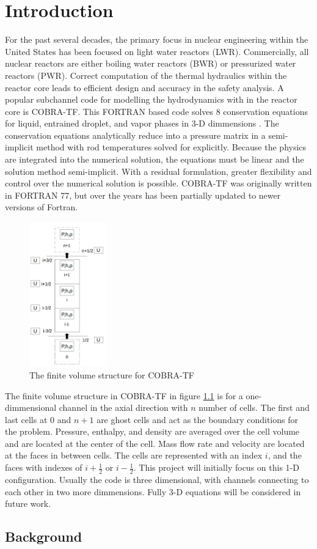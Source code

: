 \vspace*{-80mm}
\chapter{Introduction} \label{chapter1:introduction}

For the past several decades, the primary focus in nuclear engineering
within the United States has been focused on light water reactors (LWR).
Commercially, all nuclear reactors are either boiling water reactors (BWR)
or pressurized water reactors (PWR). Correct computation of the
thermal hydraulics within the reactor core leads to efficient design and
accuracy in the safety analysis. A
popular subchannel code for modelling the hydrodynamics with in the reactor core is COBRA-TF.
This FORTRAN based code solves 8 conservation equations for liquid,
entrained droplet, and vapor phases in 3-D dimmensions \cite{CTF_Theory}.
The conservation equations analytically reduce into a pressure matrix in a
semi-implicit  method with rod temperatures solved for explicitly. Because
the physics are integrated into the numerical solution, the equations must
be linear and the solution method semi-implicit. With a residual
formulation, greater flexibility and control over the numerical solution
is possible. COBRA-TF was originally written in FORTRAN 77, but over
the years has been partially updated to newer versions of Fortran.

\begin{figure}[!h]
	\centering
	\includegraphics[width=0.30\textwidth]{images/CTF-Cells}
	
	\caption{The finite volume structure for COBRA-TF}
	\label{fig:CTF-Cells}
\end{figure}

The finite volume structure in COBRA-TF in figure \ref{fig:CTF-Cells} is for
a one-dimmensional channel in the axial direction with $n$ number of cells.
The first and last cells at $0$ and $n+1$ are ghost cells and act as the
boundary conditions for the problem. Pressure, enthalpy, and density are
averaged over the cell volume and are located at the center of the cell.
Mass flow rate and velocity are located at the faces in between cells. The
cells are represented with an index $i$, and the faces with indexes of
$i+\frac{1}{2}$ or $i-\frac{1}{2}$. This project will initially focus
on this 1-D configuration. Usually the code is three dimensional, with
channels connecting to each other in two more dimmensions. Fully 3-D
equations will be considered in future work.

\section{Background}





